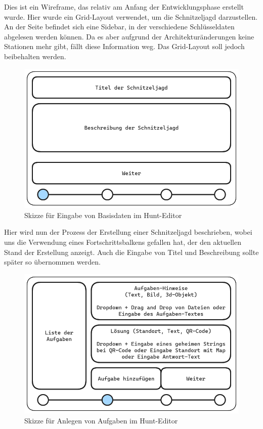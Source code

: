 Dies ist ein Wireframe, das relativ am Anfang der Entwicklungsphase erstellt wurde. Hier wurde ein Grid-Layout verwendet, um die Schnitzeljagd darzustellen. An der Seite befindet sich eine Sidebar, in der verschiedene Schlüsseldaten abgelesen werden können. Da es aber aufgrund der Architekturänderungen keine Stationen mehr gibt, fällt diese Information weg. Das Grid-Layout soll jedoch beibehalten werden.

\begin{figure}[H]
  \centering
  \includegraphics[width=1\textwidth]{images/wireframing/PrAr_Scavhunt_Wireframing-2.2.png}
  \caption{Skizze für Eingabe von Basisdaten im Hunt-Editor}
  \label{fig:wireframing-frontend-hunt-editor-4}
\end{figure}

Hier wird nun der Prozess der Erstellung einer Schnitzeljagd beschrieben, wobei uns die Verwendung eines Fortschrittsbalkens gefallen hat, der den aktuellen Stand der Erstellung anzeigt. Auch die Eingabe von Titel und Beschreibung sollte später so übernommen werden. 

\begin{figure}[H]
  \centering
  \includegraphics[width=1\textwidth]{images/wireframing/PrAr_Scavhunt_Wireframing-2.3.png}
  \caption{Skizze für Anlegen von Aufgaben im Hunt-Editor}
  \label{fig:wireframing-frontend-hunt-editor-5}
\end{figure}

